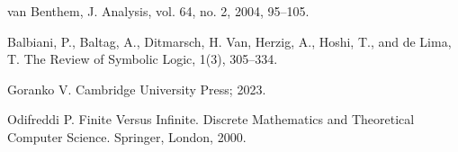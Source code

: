 \documentclass[openany]{book}
\theoremstyle{plain}
\theoremstyle{definition}
\begin{document}
\begin{thebibliography}{2}
van Benthem, J.
\newblock Analysis, vol. 64, no. 2, 2004, 95--105.
                  
Balbiani, P., Baltag, A., Ditmarsch, H. Van, Herzig, A., Hoshi, T., and de Lima, T.
\newblock The Review of Symbolic Logic, 1(3), 305--334.

Goranko V.
\newblock Cambridge University Press; 2023.

Odifreddi P.
\newblock Finite Versus Infinite. Discrete Mathematics and Theoretical Computer Science. Springer, London, 2000.

\end{thebibliography}
\end{document}
